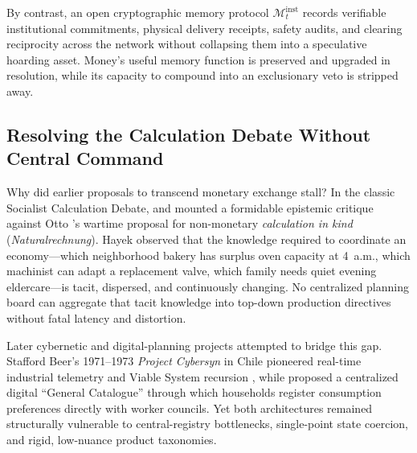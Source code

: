 \documentclass[11pt]{article}
\begin{document}
By contrast, an open cryptographic memory protocol $\mathcal{M}_{t}^{\mathrm{inst}}$ records verifiable institutional commitments, physical delivery receipts, safety audits, and clearing reciprocity across the network without collapsing them into a speculative hoarding asset. Money's useful memory function is preserved and upgraded in resolution, while its capacity to compound into an exclusionary veto is stripped away.

\subsection{Resolving the Calculation Debate Without Central Command}

Why did earlier proposals to transcend monetary exchange stall? In the classic Socialist Calculation Debate, \citet{mises1920calculation} and \citet{hayek1945knowledge} mounted a formidable epistemic critique against Otto \citet{neurath2004economic}'s wartime proposal for non-monetary \emph{calculation in kind} (\emph{Naturalrechnung}). Hayek observed that the knowledge required to coordinate an economy---which neighborhood bakery has surplus oven capacity at 4~a.m., which machinist can adapt a replacement valve, which family needs quiet evening eldercare---is tacit, dispersed, and continuously changing. No centralized planning board can aggregate that tacit knowledge into top-down production directives without fatal latency and distortion.

Later cybernetic and digital-planning projects attempted to bridge this gap. Stafford Beer's 1971--1973 \emph{Project Cybersyn} in Chile pioneered real-time industrial telemetry and Viable System recursion \citep{medina2011cybernetic}, while \citet{saros2014information} proposed a centralized digital ``General Catalogue'' through which households register consumption preferences directly with worker councils. Yet both architectures remained structurally vulnerable to central-registry bottlenecks, single-point state coercion, and rigid, low-nuance product taxonomies.
\end{document}
